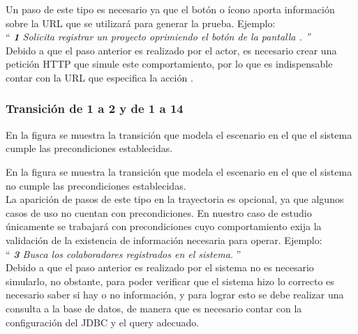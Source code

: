 Un paso de este tipo es necesario ya que el botón o ícono aporta información sobre la URL que se utilizará para generar la prueba. Ejemplo:\\

{``\it
    {\bf 1} \UCactor Solicita registrar un proyecto oprimiendo el botón  de la pantalla .
''}\\
	
	Debido a que el paso anterior es realizado por el actor, es necesario crear una petición HTTP que simule este comportamiento, por lo que es indispensable contar con la URL que especifica la acción .\\
		
	
\subsubsection{Transición de 1 a 2 y de 1 a 14}
   
En la figura  se muestra la transición que modela el escenario en el que el sistema cumple las precondiciones establecidas.
  
   
En la figura  se muestra la transición que modela el escenario en el que el sistema no cumple las precondiciones establecidas.\\
  
 La aparición de pasos de este tipo en la trayectoria es opcional, ya que algunos casos de uso no cuentan con precondiciones. En nuestro caso de estudio únicamente se trabajará con precondiciones cuyo comportamiento exija la validación de la existencia de información necesaria para operar. Ejemplo:\\

``{\it
     {\bf 3} \UCsist Busca los colaboradores registrados en el sistema. 
 }''\\
	
	Debido a que el paso anterior es realizado por el sistema no es necesario simularlo, no obstante, para poder verificar que el sistema hizo lo correcto es necesario saber si hay o no información, y para lograr esto se debe realizar una consulta a la base de datos, de manera que es necesario contar con la configuración del JDBC y el query adecuado.\\
	
